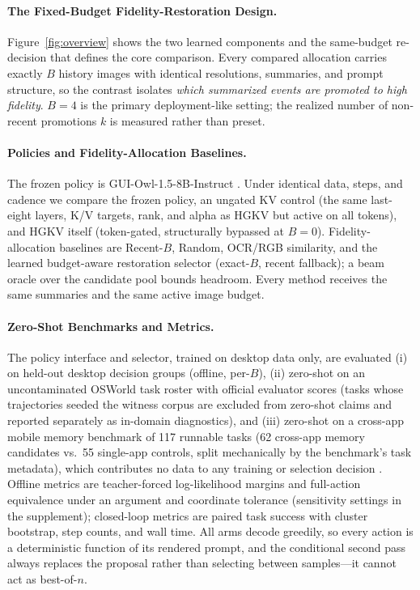 \documentclass[letterpaper]{article} %
\newcommand{\hgkv}{\textsc{HGKV}}
\begin{document}
\paragraph{The Fixed-Budget Fidelity-Restoration Design.}

Figure~\ref{fig:overview} shows the two learned components and the
same-budget re-decision that defines the core comparison.
Every compared allocation carries exactly $B$ history images with
identical resolutions, summaries, and prompt structure, so the contrast
isolates \emph{which summarized events are promoted to high fidelity}.
$B{=}4$ is the primary deployment-like setting; the realized number of
non-recent promotions $k$ is measured rather than preset.

\paragraph{Policies and Fidelity-Allocation Baselines.}

The frozen policy is GUI-Owl-1.5-8B-Instruct \citep{xu2026mobileagent35}.
Under identical data, steps, and cadence we compare the frozen policy, an
ungated KV control (the same last-eight layers, K/V targets, rank, and
alpha as \hgkv{} but active on all tokens), and \hgkv{} itself
(token-gated, structurally bypassed at $B{=}0$).
Fidelity-allocation baselines are Recent-$B$, Random, OCR/RGB similarity, and
the learned budget-aware restoration selector (exact-$B$, recent fallback); a
beam oracle over the candidate pool bounds headroom. Every method receives the
same summaries and the same active image budget.

\paragraph{Zero-Shot Benchmarks and Metrics.}

The policy interface and selector, trained on desktop data only, are evaluated
(i) on held-out desktop decision groups (offline, per-$B$), (ii) zero-shot on
an uncontaminated OSWorld task roster \citep{xie2024osworld} with official
evaluator scores (tasks whose trajectories seeded the witness corpus are
excluded from zero-shot claims and reported separately as in-domain
diagnostics), and (iii) zero-shot on a cross-app mobile memory benchmark of
117 runnable tasks (62 cross-app memory candidates vs.\ 55 single-app
controls, split mechanically by the benchmark's task metadata),
which contributes no data to any training or selection decision
\citep{kong2026mobileworld}.
Offline metrics are teacher-forced log-likelihood margins and full-action
equivalence under an argument and coordinate tolerance (sensitivity settings
in the supplement); closed-loop metrics are paired task success with
cluster bootstrap, step counts, and wall time. All arms decode greedily,
so every action is a deterministic function of its rendered prompt, and
the conditional second pass always replaces the proposal rather than
selecting between samples---it cannot act as best-of-$n$.
\end{document}
